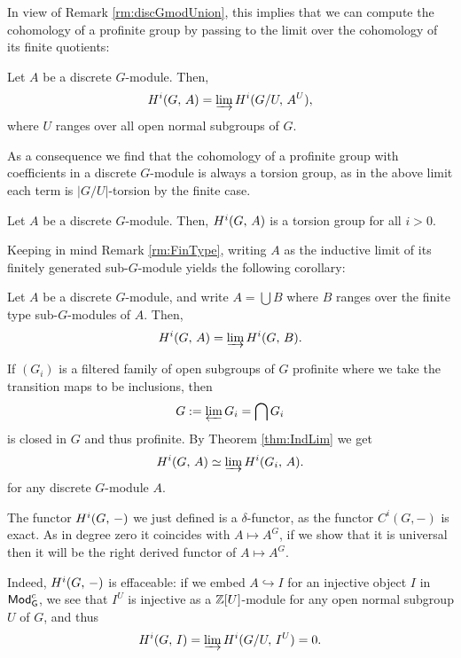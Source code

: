 \documentclass[a4paper, oneside]{memoir}
\begin{document}
In view of Remark \ref{rm:discGmodUnion}, this implies that we can compute the cohomology of a profinite group by passing to the limit over the cohomology of its finite quotients:
\begin{corollary}\label{cor:ModLim}
	Let $A$ be a discrete $G$-module. Then,
	\[
		H^{i}( G, \, A )=\varinjlim{H^{i}( G/U, \, A^U )},
	\]
	where $U$ ranges over all open normal subgroups of $G$.
\end{corollary}

As a consequence we find that the cohomology of a profinite group with coefficients in a discrete $G$-module is always a torsion group, as in the above limit each term is $|G/U|$-torsion by the finite case.

\begin{corollary}
	Let $A$ be a discrete $G$-module. Then, $H^{i}( G, \, A )$ is a torsion group for all $i>0$.
\end{corollary}

Keeping in mind Remark \ref{rm:FinType}, writing $A$ as the inductive limit of its finitely generated sub-$G$-module yields the following corollary:

\begin{corollary}
	Let $A$ be a discrete $G$-module, and write $A=\bigcup{B}$ where $B$ ranges over the finite type sub-$G$-modules of $A$. Then,
	\[
		H^{i}( G, \, A )=\varinjlim{H^{i}( G, \, B )}.
	\]
\end{corollary}

\begin{example}\label{ex:IntOpenSgr}
	If $(G_i)$ is a filtered family of open subgroups of $G$ profinite where we take the transition maps to be inclusions, then
	\[
		G:=\varprojlim{G_i}=\bigcap{G_i}
	\]
	is closed in $G$ and thus profinite.
	By Theorem \ref{thm:IndLim} we get
	\[
		H^{i}( G, \, A )\simeq \varinjlim{H^{i}( G_i, \, A )}.
	\]
	for any discrete $G$-module $A$.
\end{example}

\begin{remark}
	The functor $H^{i}( G, \, - )$ we just defined is a $\delta$-functor, as the functor $C^i{(G,-)}$ is exact. As in degree zero it coincides with $A\mapsto A^G$, if we show that it is universal then it will be the right derived functor of $A\mapsto A^G$.

	Indeed, $H^{i}( G, \, - )$ is effaceable: if we embed $A\hookrightarrow I$ for an injective object $I$ in $\mathsf{Mod}_\mathsf{G}^{c}$, we see that $I^U$ is injective as a $\mathbb{Z}[U]$-module for any open normal subgroup $U$ of $G$, and thus
	\[
		H^{i}( G, \, I )=\varinjlim{H^{i}( G/U, \, I^U )}=0.
	\]
\end{remark}
\end{document}

